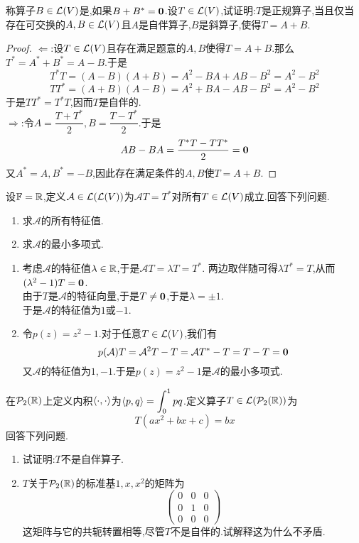 \documentclass{ctexart}
\begin{document}
\begin{problem}[12.]
    称算子$B\in\mathcal{L}(V)$是,如果$B+B^*=\mathbf0$.设$T\in\mathcal{L}(V)$,试证明:$T$是正规算子,当且仅当存在可交换的$A,B\in\mathcal{L}(V)$且$A$是自伴算子,$B$是斜算子,使得$T=A+B$.
\end{problem}
\begin{proof}
    $\Leftarrow$:设$T\in\mathcal{L}(V)$且存在满足题意的$A,B$使得$T=A+B$.那么$T^*=A^*+B^*=A-B$.于是
    \[T^*T=(A-B)(A+B)=A^2-BA+AB-B^2=A^2-B^2\]
    \[TT^*=(A+B)(A-B)=A^2+BA-AB-B^2=A^2-B^2\]
    于是$TT^*=T^*T$,因而$T$是自伴的.\\
    $\Rightarrow$:令$A=\dfrac{T+T^*}{2},B=\dfrac{T-T^*}{2}$.于是
    \[AB-BA=\dfrac{T^*T-TT^*}{2}=\mathbf0\]
    又$A^*=A,B^*=-B$,因此存在满足条件的$A,B$使$T=A+B$.
\end{proof}
\begin{problem}[13.]
    设$\mathbb{F}=\mathbb{R}$,定义$\mathcal{A}\in\mathcal{L}(\mathcal{L}(V))$为$\mathcal{A}T=T^*$对所有$T\in\mathcal{L}(V)$成立.回答下列问题.
    \begin{enumerate}[label=\tbf{(\arabic*)}]
        \item 求$\mathcal{A}$的所有特征值.
        \item 求$\mathcal{A}$的最小多项式.
    \end{enumerate}
\end{problem}
\begin{solution}
    \begin{enumerate}[label=\tbf{(\arabic*)}]
        \item 考虑$\mathcal{A}$的特征值$\lambda\in\mathbb{R}$,于是$\mathcal{A}T=\lambda T=T^*$.%
            两边取伴随可得$\lambda T^*=T$,从而$(\lambda^2-1)T=\mathbf0$.\\
            由于$T$是$\mathcal{A}$的特征向量,于是$T\neq\mathbf0$,于是$\lambda=\pm1$.\\
            于是$\mathcal{A}$的特征值为$1$或$-1$.
        \item 令$p(z)=z^2-1$.对于任意$T\in\mathcal{L}(V)$,我们有
            \[p(\mathcal{A})T=\mathcal{A}^2T-T=\mathcal{A}T^*-T=T-T=\mathbf0\]
            又$\mathcal{A}$的特征值为$1,-1$.于是$p(z)=z^2-1$是$\mathcal{A}$的最小多项式.
    \end{enumerate}
\end{solution}
\begin{problem}[14.]
    在$\mathcal{P}_2(\mathbb{R})$上定义内积$\left\langle{\cdot},{\cdot}\right\rangle$为$\left\langle{p},{q}\right\rangle=\displaystyle\int_0^1pq$.定义算子$T\in\mathcal{L}(\mathcal{P}_2(\mathbb{R}))$为
    \[T(ax^2+bx+c)=bx\]
    回答下列问题.
    \begin{enumerate}[label=\tbf{(\arabic*)}]
        \item 试证明:$T$不是自伴算子.
        \item $T$关于$\mathcal{P}_2(\mathbb{R})$的标准基$1,x,x^2$的矩阵为
            \[\begin{pmatrix}
                0&0&0\\0&1&0\\0&0&0
            \end{pmatrix}\]
            这矩阵与它的共轭转置相等,尽管$T$不是自伴的.试解释这为什么不矛盾.
    \end{enumerate}
\end{problem}
\end{document}
